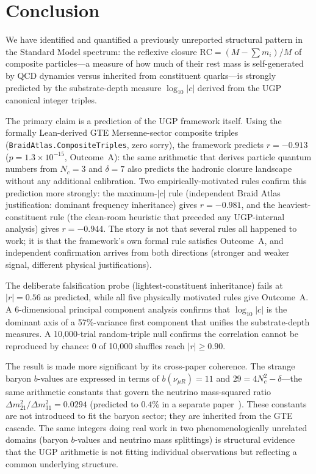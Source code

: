 \documentclass[12pt,a4paper]{article}
\newcommand{\RC}{\ensuremath{\mathrm{RC}}}
\begin{document}
\section{Conclusion}
\label{sec:conclusion}

We have identified and quantified a previously unreported structural pattern
in the Standard Model spectrum: the reflexive closure $\RC = (M - \sum m_i)/M$
of composite particles---a measure of how much of their rest mass is
self-generated by QCD dynamics versus inherited from constituent quarks---is
strongly predicted by the substrate-depth measure $\log_{10}|c|$ derived
from the UGP canonical integer triples.

The primary claim is a prediction of the UGP framework itself.
Using the formally Lean-derived GTE Mersenne-sector composite triples
(\texttt{BraidAtlas.CompositeTriples}, zero sorry), the framework predicts
$r = -0.913$ ($p = 1.3\times10^{-15}$, Outcome~A): the same arithmetic
that derives particle quantum numbers from $N_c = 3$ and $\delta = 7$ also
predicts the hadronic closure landscape without any additional calibration.
Two empirically-motivated rules confirm this prediction more strongly:
the maximum-$|c|$ rule (independent Braid Atlas justification: dominant
frequency inheritance) gives $r = -0.981$, and the heaviest-constituent rule
(the clean-room heuristic that preceded any UGP-internal analysis) gives
$r = -0.944$.
The story is not that several rules all happened to work; it is that the
framework's own formal rule satisfies Outcome~A, and independent confirmation
arrives from both directions (stronger and weaker signal, different physical
justifications).

The deliberate falsification probe (lightest-constituent inheritance) fails at $|r| = 0.56$
as predicted, while all five physically motivated rules give Outcome~A.
A 6-dimensional principal component analysis confirms that $\log_{10}|c|$
is the dominant axis of a 57\%-variance first component that unifies
the substrate-depth measures.
A 10{,}000-trial random-triple null confirms the correlation cannot be reproduced
by chance: 0 of 10{,}000 shuffles reach $|r| \geq 0.90$.

The result is made more significant by its cross-paper coherence.
The strange baryon $b$-values are expressed in terms of $b(\nu_{\mu R}) = 11$
and $29 = 4N_c^2 - \delta$---the same arithmetic constants that govern the
neutrino mass-squared ratio $\Delta m^2_{21}/\Delta m^2_{31} = 0.0294$
(predicted to $0.4\%$ in a separate paper~\cite{SpivackNeutrino}).
These constants are not introduced to fit the baryon sector; they are inherited
from the GTE cascade.
The same integers doing real work in two phenomenologically unrelated domains
(baryon $b$-values and neutrino mass splittings) is structural evidence that
the UGP arithmetic is not fitting individual observations but reflecting a
common underlying structure.
\end{document}
